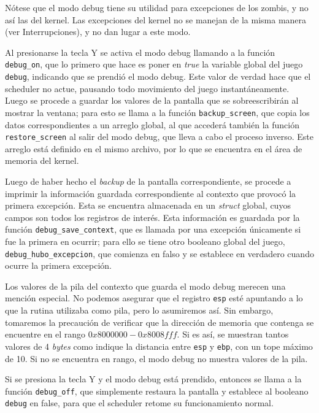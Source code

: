 \documentclass{article}
\begin{document}
	Nótese que el modo debug tiene su utilidad para excepciones de los zombis, y no así las del kernel. Las excepciones del kernel no se manejan de la misma manera (ver Interrupciones), y no dan lugar a este modo.

	Al presionarse la tecla Y se activa el modo debug llamando a la función \texttt{debug\_on}, que lo primero que hace es poner en \textit{true} la variable global del juego \texttt{debug}, indicando que se prendió el modo debug. Este valor de verdad hace que el scheduler no actue, pausando todo movimiento del juego instantáneamente. Luego se procede a guardar los valores de la pantalla que se sobreescribirán al mostrar la ventana; para esto se llama a la función \texttt{backup\_screen}, que copia los datos correspondientes a un arreglo global, al que accederá también la función \texttt{restore\_screen} al salir del modo debug, que lleva a cabo el proceso inverso. Este arreglo está definido en el mismo archivo, por lo que se encuentra en el área de memoria del kernel.

	Luego de haber hecho el \textit{backup} de la pantalla correspondiente, se procede a imprimir la información guardada correspondiente al contexto que provocó la primera excepción. Esta se encuentra almacenada en un \textit{struct} global, cuyos campos son todos los registros de interés. Esta información es guardada por la función \texttt{debug\_save\_context}, que  es llamada por una excepción únicamente si fue la primera en ocurrir; para ello se tiene otro booleano global del juego, \texttt{debug\_hubo\_excepcion}, que comienza en falso y se establece en verdadero cuando ocurre la primera excepción.

	Los valores de la pila del contexto que guarda el modo debug merecen una mención especial. No
    podemos asegurar que el registro \texttt{esp} esté apuntando a lo que la rutina utilizaba como
    pila, pero lo asumiremos así. Sin embargo, tomaremos la precaución de verificar que la dirección
    de memoria que contenga se encuentre en el rango $0x8000000 - 0x8008fff$. Si es así, se muestran tantos valores de 4 \textit{bytes} como indique la distancia entre \texttt{esp} y \texttt{ebp}, con un tope máximo de 10. Si no se encuentra en rango, el modo debug no muestra valores de la pila.

	Si se presiona la tecla Y y el modo debug está prendido, entonces se llama a la función \texttt{debug\_off}, que simplemente restaura la pantalla y establece al booleano \texttt{debug} en false, para que el scheduler retome su funcionamiento normal.
\end{document}
